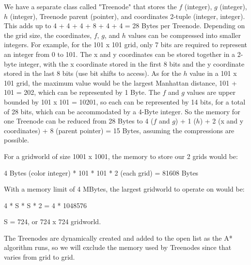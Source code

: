 \documentclass[10pt,a4paper]{article}
\begin{document}
We have a separate class called "Treenode" that stores the $f$ (integer), $g$ (integer), $h$ (integer), Treenode parent (pointer), and coordinates 2-tuple (integer, integer). This adds up to 4 + 4 + 4 + 8 + 4 + 4 = 28 Bytes per Treenode. Depending on the grid size, the coordinates, $f$, $g$, and $h$ values can be compressed into smaller integers. For example, for the 101 x 101 grid, only 7 bits are required to represent an integer from 0 to 101. The x and y coordinates can be stored together in a 2-byte integer, with the x coordinate stored in the first 8 bits and the y coordinate stored in the last 8 bits (use bit shifts to access). As for the $h$ value in a 101 x 101 grid, the maximum value would be the largest Manhattan distance, 101 + 101 = 202, which can be represented by 1 Byte. The $f$ and $g$ values are upper bounded by 101 x 101 = 10201, so each can be represented by 14 bits, for a total of 28 bits, which can be accommodated by a 4-Byte integer. So the memory for one Treenode can be reduced from 28 Bytes to 4 ($f$ and $g$) + 1 ($h$) + 2 (x and y coordinates) + 8 (parent pointer) = 15 Bytes, assuming the compressions are possible.

For a gridworld of size 1001 x 1001, the memory to store our 2 grids would be:
\begin{center}
4 Bytes (color integer) * 101 * 101 * 2 (each grid) = 81608 Bytes
\end{center}

With a memory limit of 4 MBytes, the largest gridworld to operate on would be:
\begin{center}
4  * S * S * 2 = 4 * 1048576
\end{center}
\begin{center}
S = 724, or 724 x 724 gridworld.
\end{center}

The Treenodes are dynamically created and added to the open list as the A* algorithm runs, so we will exclude the memory used by Treenodes since that varies from grid to grid.
\end{document}
